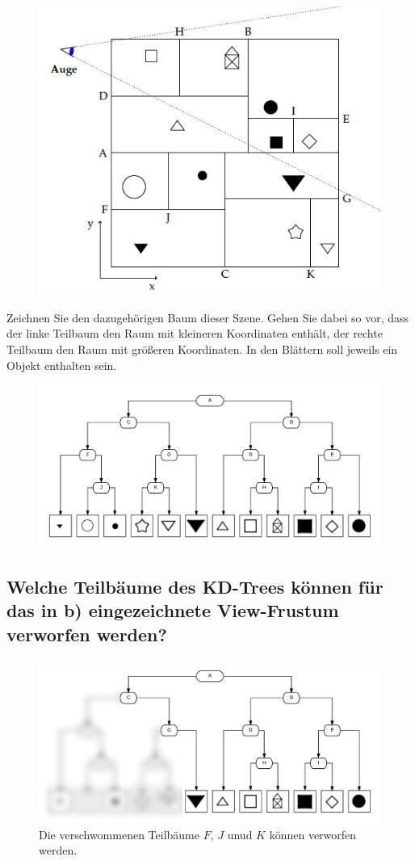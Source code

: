 \documentclass[a4paper,10pt,DIV=14]{article}
\begin{document}
\begin{figure}[!htbp]
	\centering
	\includegraphics[]{scene}
\end{figure}

Zeichnen Sie den dazugehörigen Baum dieser Szene. Gehen Sie dabei so vor, dass der linke Teilbaum den Raum mit kleineren Koordinaten enthält, der rechte Teilbaum den Raum mit größeren Koordinaten. In den Blättern soll jeweils ein Objekt enthalten sein.

\begin{figure}[!htbp]
	\centering
	\includegraphics[width=1\linewidth]{kd}
\end{figure}

\newpage
\subsection{Welche Teilbäume des KD-Trees können für das in b) eingezeichnete View-Frustum verworfen werden?}

\begin{figure}[!htbp]
	\centering
	\includegraphics[width=1\linewidth]{kd_blur}
	\caption*{Die verschwommenen Teilbäume $F$, $J$ unud $K$ können verworfen werden.}
\end{figure}
\end{document}
